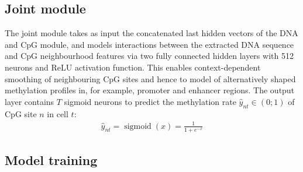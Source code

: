 \subsection{Joint module}

The joint module takes as input the concatenated last hidden vectors of the DNA and CpG module, and models interactions between the extracted DNA sequence and CpG neighbourhood features via two fully connected hidden layers with 512 neurons and ReLU activation function. This enables context-dependent smoothing of neighbouring CpG sites and hence to model of alternatively shaped methylation profiles in, for example, promoter and enhancer regions. The output layer contains $T$ sigmoid neurons to predict the methylation rate $\hat{y}_{nt}\in(0;1)$ of CpG site $n$ in cell $t$:
\begin{align} \label{eq:dcpg_y}
  \hat{y}_{nt}=\operatorname{sigmoid}(x)=\frac{1}{1+e^{-x}}
\end{align}


\subsection{Model training}

